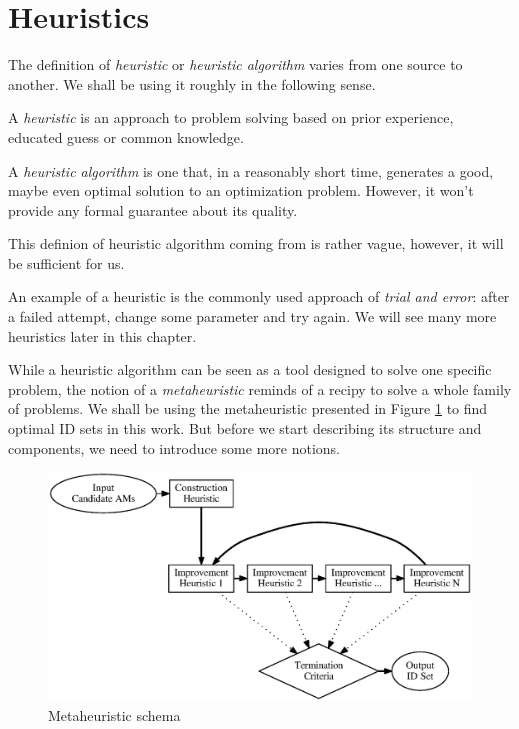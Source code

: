 \section{Heuristics}
\label{section-mip-heuristics}

The definition of \textit{heuristic} or \textit{heuristic algorithm} varies from one source to another. We shall be using it roughly in the following sense.

\begin{define}[Heuristic]
	A \textit{heuristic} is an approach to problem solving based on prior experience, educated guess or common knowledge.
\end{define}

\begin{define}
	A \textit{heuristic algorithm} is one that, in a reasonably short time, generates a good, maybe even optimal solution to an optimization problem. However, it won’t provide any formal guarantee about its quality.
\end{define} 

This definion of heuristic algorithm coming from \cite{heu-lecture} is rather vague, however, it will be sufficient for us.

An example of a heuristic is the commonly used approach of \textit{trial and error}: after a failed attempt, change some parameter and try again. We will see many more heuristics later in this chapter.

While a heuristic algorithm can be seen as a tool designed to solve one specific problem, the notion of a \textit{metaheuristic} reminds of a recipy to solve a whole family of problems. We shall be using the metaheuristic presented in Figure \ref{image-metaheuristic} to find optimal ID sets in this work. But before we start describing its structure and components, we need to introduce some more notions.

\begin{figure}
  \caption{Metaheuristic schema}
  \label{image-metaheuristic}
  \centering
    \includegraphics[width=\textwidth]{images/metaheuristic}
\end{figure}

